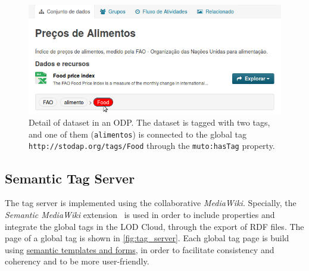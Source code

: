 \begin{figure}[ht]
\begin{center}
\includegraphics[scale=.5]{images/local_link.png}
\caption[Detail of dataset in an ODP.]{Detail of dataset in an ODP. The dataset is tagged with two tags, and one of them (\texttt{alimentos}) is connected to the global tag \texttt{http://stodap.org/tags/Food} through the \texttt{muto:hasTag} property.}
\label{fig:local_link}
\end{center}
\end{figure}

\subsection{Semantic Tag Server}

The tag server is implemented using the collaborative \emph{MediaWiki}. 
Specially, the \emph{Semantic MediaWiki} extension~\cite{Kroetzsch2007} is used in order to include properties and integrate the global tags in the LOD Cloud, through the export of RDF files.
The page of a global tag is shown in \autoref{fig:tag_server}.
Each global tag page is build using \href{https://www.mediawiki.org/wiki/Extension:Semantic_Forms}{semantic templates and forms}, in order to facilitate consistency and coherency and to be more user-friendly.

